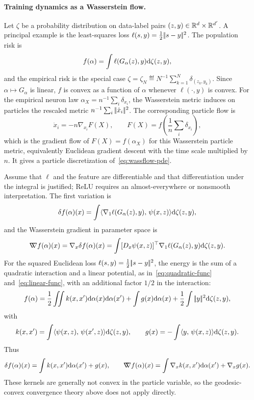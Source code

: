 \paragraph{Training dynamics as a Wasserstein flow.}
Let $\zeta$ be a probability distribution on data-label pairs $(z,y)\in\mathbb{R}^d\times\mathbb{R}^{d'}$. A principal example is the least-squares loss $\ell(s,y)=\frac12|\!| s-y |\!|^2$. The population risk is
\[
	f(\alpha)=\int \ell(G_\alpha(z),y)\mathrm{d}\zeta(z,y),
\]
and the empirical risk is the special case $\zeta=\zeta_N\eqdef N^{-1}\sum_{k=1}^N\delta_{(z_k,y_k)}$. Since $\alpha\mapsto G_\alpha$ is linear, $f$ is convex as a function of $\alpha$ whenever $\ell(\cdot,y)$ is convex. For the empirical neuron law $\alpha_X=n^{-1}\sum_i\delta_{x_i}$, the Wasserstein metric induces on particles the rescaled metric $n^{-1}\sum_i|\!| \dot x_i |\!|^2$. The corresponding particle flow is
\[
	\dot x_i=-n\nabla_{x_i}F(X),
	\qquad
	F(X)=f\!\left(\frac1n\sum_i\delta_{x_i}\right),
\]
which is the gradient flow of $F(X)=f(\alpha_X)$ for this Wasserstein particle metric, equivalently Euclidean gradient descent with the time scale multiplied by $n$. It gives a particle discretization of~\eqref{eq:wassflow-pde}.

Assume that $\ell$ and the feature are differentiable and that differentiation under the integral is justified; ReLU requires an almost-everywhere or nonsmooth interpretation. The first variation is
\begin{equation}\label{eq-mlp-first-variation-general}
	\delta f(\alpha)(x)
	=
	\int
	\langle \nabla_1\ell(G_\alpha(z),y),\,\psi(x,z)\rangle
		\mathrm{d}\zeta(z,y),
\end{equation}
and the Wasserstein gradient in parameter space is
\[
	\mathord{\nabla\mkern-9.3mu\nabla} f(\alpha)(x)
	=
	\nabla_x\delta f(\alpha)(x)
	=
	\int
	[D_x\psi(x,z)]^\top\nabla_1\ell(G_\alpha(z),y)
		\mathrm{d}\zeta(z,y).
\]
For the squared Euclidean loss $\ell(s,y)=\frac12|\!| s-y |\!|^2$, the energy is the sum of a quadratic interaction and a linear potential, as in~\eqref{eq:quadratic-func} and~\eqref{eq:linear-func}, with an additional factor $1/2$ in the interaction:
\begin{equation}\label{eq-mlp-square-loss-quadratic-linear}
	f(\alpha)
	=
	\frac12\iint k(x,x')\mathrm{d}\alpha(x)\mathrm{d}\alpha(x')
	+
	\int g(x)\mathrm{d}\alpha(x)
	+\frac12\int|\!| y |\!|^2\mathrm{d}\zeta(z,y),
\end{equation}
with
\begin{equation}\label{eq-mlp-kernel-linear-potential}
	k(x,x')=\int\langle \psi(x,z),\,\psi(x',z)\rangle\mathrm{d}\zeta(z,y),
	\qquad
	g(x)=-\int\langle y,\,\psi(x,z)\rangle\mathrm{d}\zeta(z,y).
\end{equation}
Thus
\[
	\delta f(\alpha)(x)=\int k(x,x')\mathrm{d}\alpha(x')+g(x),
	\qquad
	\mathord{\nabla\mkern-9.3mu\nabla} f(\alpha)(x)=\int\nabla_x k(x,x')\mathrm{d}\alpha(x')+\nabla_xg(x).
\]
These kernels are generally not convex in the particle variable, so the geodesic-convex convergence theory above does not apply directly.

